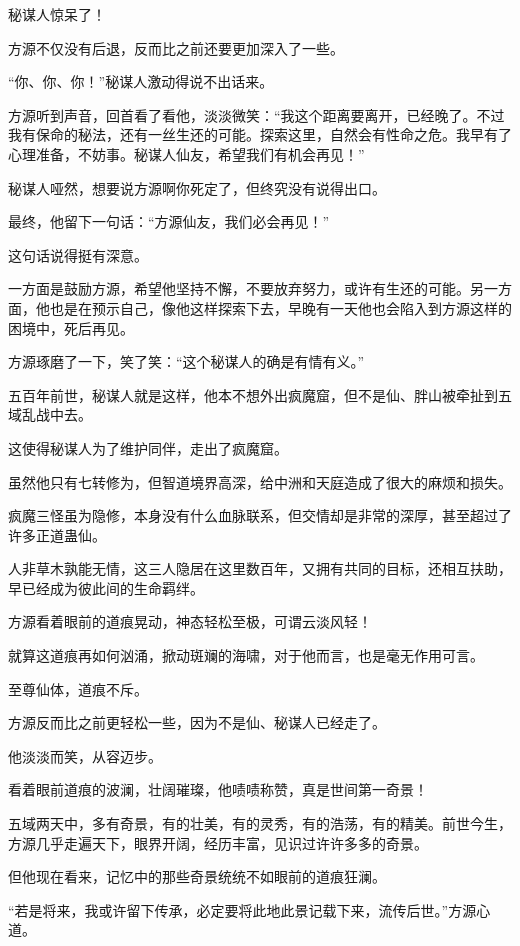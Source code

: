 \begin{this_body}
秘谋人惊呆了！

方源不仅没有后退，反而比之前还要更加深入了一些。

“你、你、你！”秘谋人激动得说不出话来。

方源听到声音，回首看了看他，淡淡微笑：“我这个距离要离开，已经晚了。不过我有保命的秘法，还有一丝生还的可能。探索这里，自然会有性命之危。我早有了心理准备，不妨事。秘谋人仙友，希望我们有机会再见！”

秘谋人哑然，想要说方源啊你死定了，但终究没有说得出口。

最终，他留下一句话：“方源仙友，我们必会再见！”

这句话说得挺有深意。

一方面是鼓励方源，希望他坚持不懈，不要放弃努力，或许有生还的可能。另一方面，他也是在预示自己，像他这样探索下去，早晚有一天他也会陷入到方源这样的困境中，死后再见。

方源琢磨了一下，笑了笑：“这个秘谋人的确是有情有义。”

五百年前世，秘谋人就是这样，他本不想外出疯魔窟，但不是仙、胖山被牵扯到五域乱战中去。

这使得秘谋人为了维护同伴，走出了疯魔窟。

虽然他只有七转修为，但智道境界高深，给中洲和天庭造成了很大的麻烦和损失。

疯魔三怪虽为隐修，本身没有什么血脉联系，但交情却是非常的深厚，甚至超过了许多正道蛊仙。

人非草木孰能无情，这三人隐居在这里数百年，又拥有共同的目标，还相互扶助，早已经成为彼此间的生命羁绊。

方源看着眼前的道痕晃动，神态轻松至极，可谓云淡风轻！

就算这道痕再如何汹涌，掀动斑斓的海啸，对于他而言，也是毫无作用可言。

至尊仙体，道痕不斥。

方源反而比之前更轻松一些，因为不是仙、秘谋人已经走了。

他淡淡而笑，从容迈步。

看着眼前道痕的波澜，壮阔璀璨，他啧啧称赞，真是世间第一奇景！

五域两天中，多有奇景，有的壮美，有的灵秀，有的浩荡，有的精美。前世今生，方源几乎走遍天下，眼界开阔，经历丰富，见识过许许多多的奇景。

但他现在看来，记忆中的那些奇景统统不如眼前的道痕狂澜。

“若是将来，我或许留下传承，必定要将此地此景记载下来，流传后世。”方源心道。

\end{this_body}

